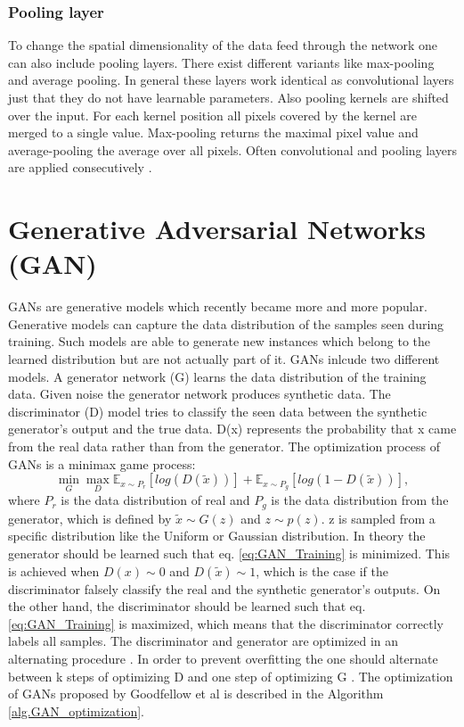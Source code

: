 \subsubsection{Pooling layer}
To change the spatial dimensionality of the data feed through the network one can also include pooling layers. There exist different variants like max-pooling and average pooling. In general these layers work identical as convolutional layers just that they do not have learnable parameters. Also pooling kernels are shifted over the input. For each kernel position all pixels covered by the kernel are merged to a single value. Max-pooling returns the maximal pixel value and average-pooling the average over all pixels. Often convolutional and pooling layers are applied consecutively \cite{OShea2015}.

\section{Generative Adversarial Networks (GAN)}
GANs are generative models which recently became more and more popular. Generative models can capture the data distribution of the samples seen during training. Such models are able to generate new instances which belong to the learned distribution but are not actually part of it. GANs inlcude two different models. A generator network (G) learns the data distribution of the training data. Given noise the generator network produces synthetic data. The discriminator (D) model tries to classify the seen data between the synthetic generator's output and the true data. D(x) represents the probability that x came from the real data rather than from the generator. The optimization process of GANs is a minimax game process:
\begin{equation}
    \min_{G} \max_{D} \mathbb{E}_{x \sim P_{r}} [log(D(\tilde{x}))] + \mathbb{E}_{x \sim P_{g}}[log(1-D(\tilde{x}))],
    \label{eq:GAN_Training}
\end{equation}
where $P_{r}$ is the data distribution of real and $P_{g}$ is the data distribution from the generator, which is defined by  $\tilde{x}  \sim G(z)$ and  $z \sim p(z)$. z is sampled from a specific distribution like the Uniform or Gaussian distribution. In theory the generator should be learned such that eq. \ref{eq:GAN_Training} is minimized. This is achieved when $D(x) \sim 0$ and $D(\tilde{x}) \sim 1$, which is the case if the discriminator falsely classify the real and the synthetic generator's outputs. On the other hand, the discriminator should be learned such that eq. \ref{eq:GAN_Training} is maximized, which means that the discriminator correctly labels all samples. The discriminator and generator are optimized in an alternating procedure \cite{Goodfellow2014}. In order to prevent overfitting the one should alternate between k steps of optimizing D and one step of optimizing G \cite{Goodfellow2014}. The optimization of GANs proposed by Goodfellow et al \cite{Goodfellow2014} is described in the Algorithm \ref{alg.GAN_optimization}.


